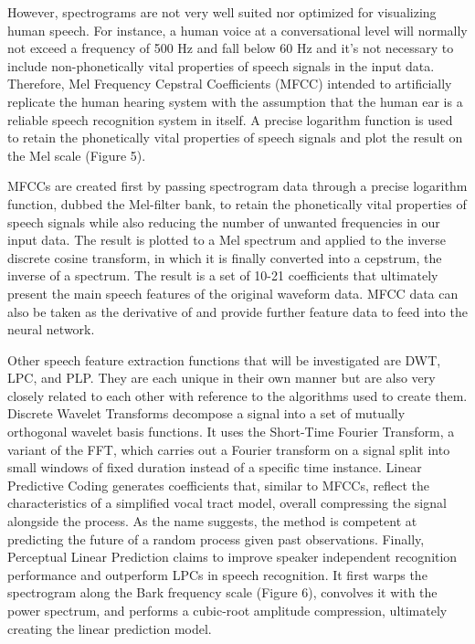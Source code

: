 However, spectrograms are not very well suited nor optimized for visualizing human speech. For instance, a human voice at a conversational level will normally not exceed a frequency of 500 Hz and fall below 60 Hz and it’s not necessary to include non-phonetically vital properties of speech signals in the input data. Therefore, Mel Frequency Cepstral Coefficients (MFCC) intended to artificially replicate the human hearing system with the assumption that the human ear is a reliable speech recognition system in itself. A precise logarithm function is used to retain the phonetically vital properties of speech signals and plot the result on the Mel scale (Figure 5). 
\par
MFCCs are created first by passing spectrogram data through a precise logarithm function, dubbed the Mel-filter bank, to retain the phonetically vital properties of speech signals while also reducing the number of unwanted frequencies in our input data. The result is plotted to a Mel spectrum and applied to the inverse discrete cosine transform, in which it is finally converted into a cepstrum, the inverse of a spectrum. The result is a set of 10-21 coefficients that ultimately present the main speech features of the original waveform data. MFCC data can also be taken as the derivative of and provide further feature data to feed into the neural network. 
\par
Other speech feature extraction functions that will be investigated are DWT, LPC, and PLP. They are each unique in their own manner but are also very closely related to each other with reference to the algorithms used to create them. Discrete Wavelet Transforms decompose a signal into a set of mutually orthogonal wavelet basis functions. It uses the Short-Time Fourier Transform, a variant of the FFT, which carries out a Fourier transform on a signal split into small windows of fixed duration instead of a specific time instance. Linear Predictive Coding generates coefficients that, similar to MFCCs, reflect the characteristics of a simplified vocal tract model, overall compressing the signal alongside the process. As the name suggests, the method is competent at predicting the future of a random process given past observations. Finally, Perceptual Linear Prediction claims to improve speaker independent recognition performance and outperform LPCs in speech recognition. It first warps the spectrogram along the Bark frequency scale (Figure 6), convolves it with the power spectrum, and performs a cubic-root amplitude compression, ultimately creating the linear prediction model.